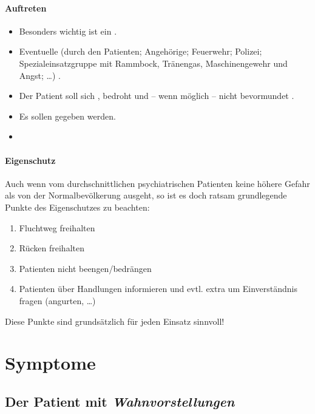 \paragraph{Auftreten} 

\begin{itemize}
    \item Besonders wichtig ist ein .
    \item  Eventuelle  (durch den
    Patienten; Angehörige; Feuerwehr; Polizei;
    Spezialeinsatzgruppe mit Rammbock, Tränengas,
    Maschinengewehr und Angst; \ldots) .
    \item Der Patient soll sich ,
    bedroht und -- wenn möglich -- nicht bevormundet
    .
    \item Es sollen  gegeben werden.
   \item {}
\end{itemize}

\paragraph{Eigenschutz} Auch wenn vom durchschnittlichen
psychiatrischen Patienten keine höhere Gefahr als von der
Normalbevölkerung ausgeht, so ist es doch ratsam
grundlegende Punkte des Eigenschutzes zu beachten:

\begin{enumerate}
    \item Fluchtweg freihalten
    \item Rücken freihalten
    \item Patienten nicht beengen/bedrängen
    \item Patienten über Handlungen informieren und evtl.
    extra um Einverständnis fragen (angurten, \ldots)
\end{enumerate}


Diese Punkte sind grundsätzlich für jeden Einsatz sinnvoll!



\section{Symptome}

\subsection{Der Patient mit \emph{Wahnvorstellungen}}

